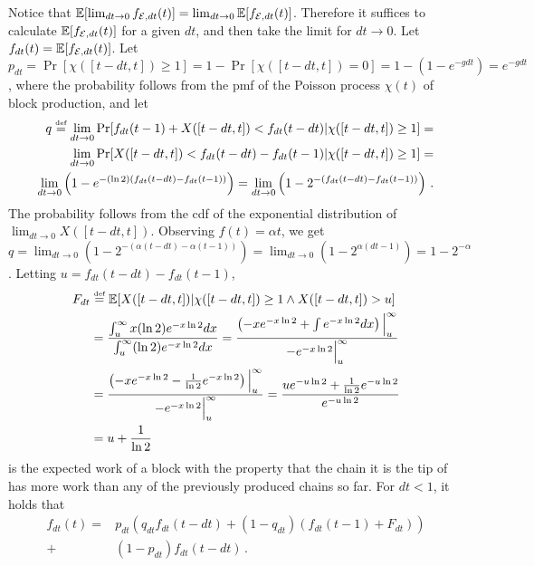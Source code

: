 Notice that $\mathop{{}\mathbb{E}}[\lim_{dt \to 0} f_{\mathcal{E},dt}(t)] = \lim_{dt \to 0} \mathop{{}\mathbb{E}}[f_{\mathcal{E},dt}(t)]$.
Therefore it suffices to calculate $\mathop{{}\mathbb{E}}[f_{\mathcal{E},dt}(t)]$ for a given $dt$,
and then take the limit for $dt \to 0$.
Let $f_{dt}(t) = \mathop{{}\mathbb{E}}[f_{\mathcal{E},dt}(t)]$.
Let $p_{dt} = \Pr[\chi([t - dt, t]) \geq 1] = 1 - \Pr[\chi([t - dt, t]) = 0] = 1 - (1 - e^{-g dt}) = e^{-g dt}$, where
the probability follows from the pmf of the Poisson process $\chi(t)$
of block production,
and let
\begin{align*}
  q \stackrel{\text{\tiny def}}{=} \lim_{dt \to 0} \Pr[f_{dt}(t - 1) + X([t - dt, t]) < f_{dt}(t - dt)|\chi([t - dt, t]) \geq 1] =\\
           \lim_{dt \to 0} \Pr[X([t - dt, t]) < f_{dt}(t - dt) - f_{dt}(t - 1)|\chi([t - dt, t]) \geq 1] = \\
           \lim_{dt \to 0} \left( 1 - e^{-(\ln2) (f_{dt}(t - dt) - f_{dt}(t - 1))}\right) =
           \lim_{dt \to 0} \left(1 - 2^{-(f_{dt}(t - dt) - f_{dt}(t - 1))}\right)
  \,.
\end{align*}
The probability follows from the cdf of the exponential distribution of $\lim_{dt \to 0} X([t - dt, t])$.
Observing $f(t) = \alpha t$, we get $q = \lim_{dt \to 0}\left(1 - 2^{-(\alpha(t - dt) - \alpha(t - 1))}\right)
= \lim_{dt \to 0}\left(1 - 2^{\alpha (dt - 1)}\right) = 1 - 2^{-\alpha}$.
Letting $u = f_{dt}(t - dt) - f_{dt}(t - 1)$,
\begin{align*}
  F_{dt} &\stackrel{\text{\tiny def}}{=} \mathop{{}\mathbb{E}}[X([t - dt, t])|\chi([t - dt, t]) \geq 1 \land X([t - dt, t]) > u]\\
         &= \frac{\int_u^\infty x (\ln2) e^{-x \ln2} dx}{\int_u^\infty (\ln2) e^{-x \ln2} dx}
          = \frac{\left(-x e^{-x \ln2} + \int{e^{-x \ln2} dx}\right)\Big|_u^\infty}{-e^{-x \ln2}\Big|_u^\infty}\\
         &= \frac{\left(-x e^{-x \ln2} - \frac{1}{\ln2} e^{-x \ln2}\right)\Big|_u^\infty}{-e^{-x \ln2}\Big|_u^\infty}
          = \frac{u e^{-u\ln2} + \frac{1}{\ln2} e^{-u \ln2}}{e^{-u \ln2}}\\
         &= u + \frac{1}{\ln2}\,
\end{align*}
is the expected work of a block with the property that the chain it is the tip of has more work than any of the
previously produced chains so far.
For $dt < 1$, it holds that
\begin{align*}
  f_{dt}(t) =
      &p_{dt}\left(q_{dt}f_{dt}(t - dt) + (1 - q_{dt})(f_{dt}(t - 1) + F_{dt})\right)\\
    + &(1 - p_{dt})f_{dt}(t - dt)\,.
\end{align*}
